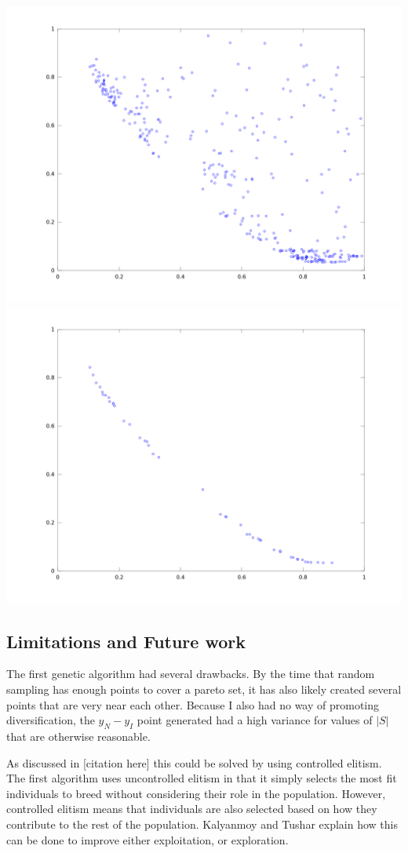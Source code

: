 \documentclass{article}
\begin{document}
\includegraphics[scale=.1]{ga_points.png}
\includegraphics[scale=.1]{ga_pareto.png}

\subsection{Limitations and Future work}
The first genetic algorithm had several drawbacks.
By the time that random sampling has enough points to cover a pareto set, it has also likely created several points that are very near each other.
Because I also had no way of promoting diversification, the $y_N - y_I$ point generated had a high variance for values of $|S|$ that are otherwise reasonable.

As discussed in [citation here] this could be solved by using controlled elitism.
The first algorithm uses uncontrolled elitism in that it simply selects the most fit individuals to breed without considering their role in the population.
However, controlled elitism means that individuals are also selected based on how they contribute to the rest of the population.
Kalyanmoy and Tushar explain how this can be done to improve either exploitation, or exploration.
\end{document}
